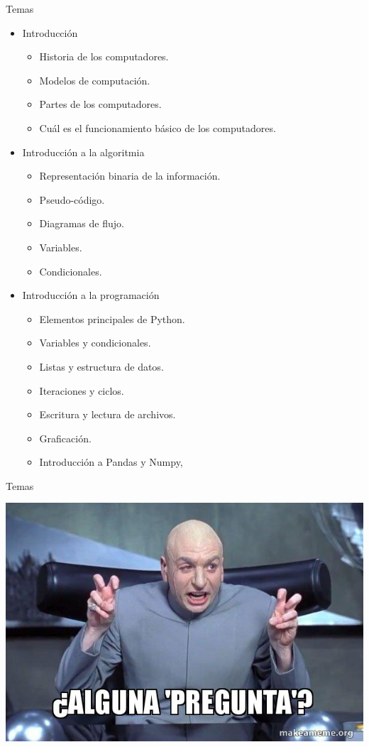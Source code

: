\documentclass[10pt,xcolor={dvipsnames}]{beamer}
\begin{document}
\begin{frame}{Temas}
\begin{itemize}
\item<1-20> Introducción
	\begin{itemize}
		\item<2-5> Historia de los computadores. 
		\item<3-5> Modelos de computación. 
		\item<4-5> Partes de los computadores. 
		\item<5> Cuál es el funcionamiento básico de los computadores.
	\end{itemize}
\item<6-20> Introducción a la algoritmia
	\begin{itemize}
		\item<7-11> Representación binaria de la información. 
		\item<8-11> Pseudo-código. 
		\item<9-11> Diagramas de flujo.
		\item<10-11> Variables. 
		\item<11> Condicionales. 
	\end{itemize}
\item<12-20> Introducción a la programación
	\begin{itemize}
		\item<13-19> Elementos principales de Python.
		\item<14-19> Variables y condicionales.
		\item<15-19> Listas y estructura de datos.
		\item<16-19> Iteraciones y ciclos.
		\item<17-19> Escritura y lectura de archivos.
		\item<18-19> Graficación.
		\item<19> Introducción a Pandas y Numpy,
	\end{itemize}
\end{itemize}
\end{frame}

\begin{frame}{Temas}
\begin{center}
\includegraphics[scale=0.6]{Figures/Pregunta}
\end{center}
\end{frame}
\end{document}
